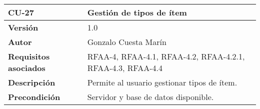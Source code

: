 \begin{longtable}[]{@{}ll@{}}
\toprule
\begin{minipage}[b]{0.19\columnwidth}\raggedright
\textbf{CU-27}\strut
\end{minipage} & \begin{minipage}[b]{0.75\columnwidth}\raggedright
\textbf{Gestión de tipos de ítem}\strut
\end{minipage}\tabularnewline
\midrule
\endhead
\begin{minipage}[t]{0.19\columnwidth}\raggedright
\textbf{Versión}\strut
\end{minipage} & \begin{minipage}[t]{0.75\columnwidth}\raggedright
1.0\strut
\end{minipage}\tabularnewline
\begin{minipage}[t]{0.19\columnwidth}\raggedright
\textbf{Autor}\strut
\end{minipage} & \begin{minipage}[t]{0.75\columnwidth}\raggedright
Gonzalo Cuesta Marín\strut
\end{minipage}\tabularnewline
\begin{minipage}[t]{0.19\columnwidth}\raggedright
\textbf{Requisitos asociados}\strut
\end{minipage} & \begin{minipage}[t]{0.75\columnwidth}\raggedright
RFAA-4, RFAA-4.1, RFAA-4.2, RFAA-4.2.1, RFAA-4.3, RFAA-4.4\strut
\end{minipage}\tabularnewline
\begin{minipage}[t]{0.19\columnwidth}\raggedright
\textbf{Descripción}\strut
\end{minipage} & \begin{minipage}[t]{0.75\columnwidth}\raggedright
Permite al usuario gestionar tipos de ítem.\strut
\end{minipage}\tabularnewline
\begin{minipage}[t]{0.19\columnwidth}\raggedright
\textbf{Precondición}\strut
\end{minipage} & \begin{minipage}[t]{0.75\columnwidth}\raggedright
Servidor y base de datos disponible.


\end{minipage}
\end{longtable}
